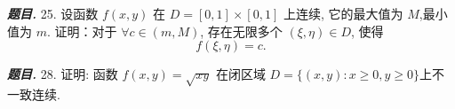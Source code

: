 \documentclass[10pt, a4paper, oneside]{ctexart}
\newenvironment{problem}{\begin{framed}\par\noindent\textbf{\textit{题目. }}}{\end{framed}\par}
\begin{document}
\begin{problem}
    25. 设函数 $f(x, y)$ 在 $D=[0,1] \times[0,1]$ 上连续, 它的最大值为 $M$,最小值为 $m$. 证明：对于 $\forall c \in(m, M)$, 存在无限多个 $(\xi, \eta) \in D$, 使得
    $$
    f(\xi, \eta)=c .
    $$
\end{problem}

\begin{problem}
    28. 证明: 函数 $f(x, y)=\sqrt{x y}$ 在闭区域 $D=\{(x, y): x \geqslant 0, y \geqslant 0\}$上不一致连续.
\end{problem}
\end{document}
